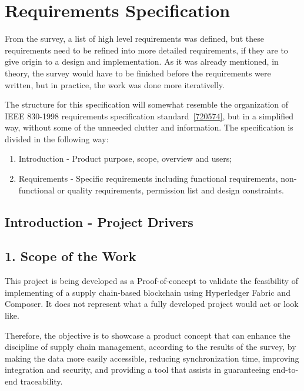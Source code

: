 \section{Requirements Specification}
\label{sec:requirements-specs}
From the survey, a list of high level requirements was defined, but these requirements need to be refined into more detailed requirements, if they are to give origin to a design and implementation. As it was already mentioned, in theory, the survey would have to be finished before the requirements were written, but in practice, the work was done more iterativelly.

The structure for this specification will somewhat resemble the organization of IEEE 830-1998 requirements specification standard~\ref{720574}, but in a simplified way, without some of the unneeded clutter and information. The specification is divided in the following way:
\begin{enumerate}
	\item Introduction - Product purpose, scope, overview and users;
	\item Requirements - Specific requirements including functional requirements, non-functional or quality requirements, permission list and design constraints.
\end{enumerate}

\subsection{Introduction - Project Drivers}

\subsection*{1. Scope of the Work}
		\par This project is being developed as a Proof-of-concept to validate the feasibility of implementing of a supply chain-based blockchain using Hyperledger Fabric and Composer. It does not represent what a fully developed project would act or look like.

		\par Therefore, the objective is to showcase a product concept that can enhance the discipline of supply chain management, according to the results of the survey, by making the data more easily accessible, reducing synchronization time, improving integration and security, and providing a tool that assists in guaranteeing end-to-end traceability.

